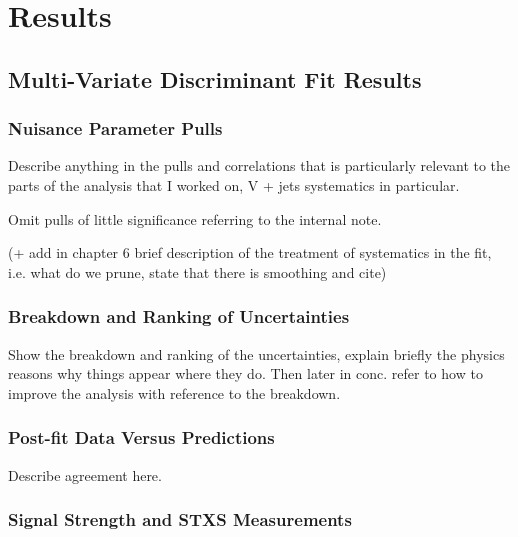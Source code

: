 \chapter{Results}%
\label{ch:results}
\section{\texorpdfstring{\VHbb}{VH->bb} Multi-Variate Discriminant Fit Results}%
\label{sec:mva-results}

\subsection{Nuisance Parameter Pulls}
Describe anything in the pulls and correlations that is particularly relevant to
the parts of the analysis that I worked on, V + jets systematics in particular.

Omit pulls of little significance referring to the internal note.

(+ add in chapter 6 brief description of the treatment of systematics in the
fit, i.e. what do we prune, state that there is smoothing and cite)


\subsection{Breakdown and Ranking of Uncertainties}
Show the breakdown and ranking of the uncertainties, explain briefly the physics
reasons why things appear where they do. Then later in conc. refer to how to
improve the analysis with reference to the breakdown.



\subsection{Post-fit Data Versus Predictions}
Describe agreement here.







\clearpage

\subsection{Signal Strength and STXS Measurements}

